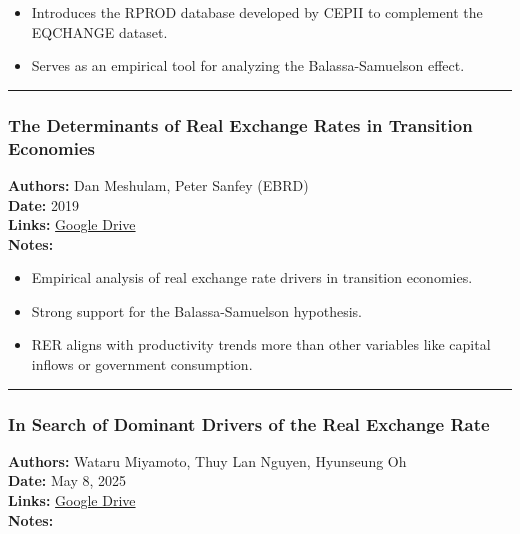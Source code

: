 \documentclass[
  11pt,
]{article}
\providecommand{\tightlist}{%
  \setlength{\itemsep}{0pt}\setlength{\parskip}{0pt}}
\begin{document}
\begin{itemize}
\tightlist
\item
  Introduces the RPROD database developed by CEPII to complement the
  EQCHANGE dataset.
\item
  Serves as an empirical tool for analyzing the Balassa-Samuelson
  effect.
\end{itemize}

\begin{center}\rule{0.5\linewidth}{0.5pt}\end{center}

\subsubsection{The Determinants of Real Exchange Rates in Transition
Economies}\label{the-determinants-of-real-exchange-rates-in-transition-economies}

\textbf{Authors:} Dan Meshulam, Peter Sanfey (EBRD)\\
\textbf{Date:} 2019\\
\textbf{Links:}
\href{https://drive.google.com/file/d/1MldCJB2yPD3AEI93kt9qSX11rjcTdySo/view?usp=sharing}{Google
Drive}\\
\textbf{Notes:}

\begin{itemize}
\tightlist
\item
  Empirical analysis of real exchange rate drivers in transition
  economies.
\item
  Strong support for the Balassa-Samuelson hypothesis.
\item
  RER aligns with productivity trends more than other variables like
  capital inflows or government consumption.
\end{itemize}

\begin{center}\rule{0.5\linewidth}{0.5pt}\end{center}

\subsubsection{In Search of Dominant Drivers of the Real Exchange
Rate}\label{in-search-of-dominant-drivers-of-the-real-exchange-rate}

\textbf{Authors:} Wataru Miyamoto, Thuy Lan Nguyen, Hyunseung Oh\\
\textbf{Date:} May 8, 2025\\
\textbf{Links:}
\href{https://drive.google.com/file/d/1v1P90qYEBl_1tm_MXqShOefqqOm5Fr2j/view?usp=sharing}{Google
Drive}\\
\textbf{Notes:}
\end{document}
